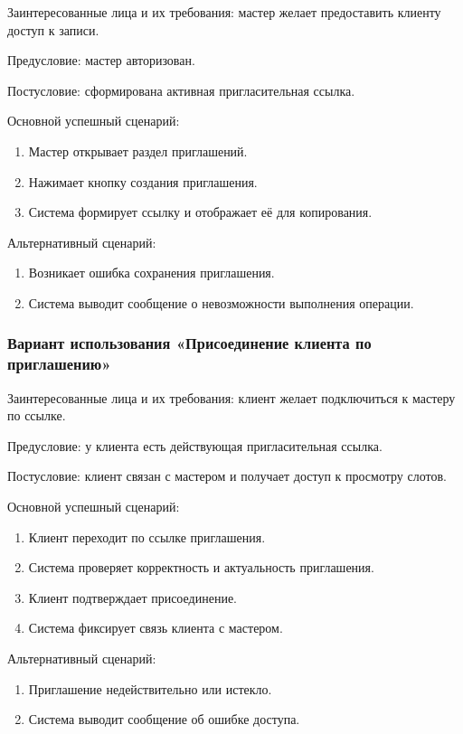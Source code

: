 Заинтересованные лица и их требования: мастер желает предоставить клиенту доступ к записи.

Предусловие: мастер авторизован.

Постусловие: сформирована активная пригласительная ссылка.

Основной успешный сценарий:
\begin{enumerate}
\item Мастер открывает раздел приглашений.
\item Нажимает кнопку создания приглашения.
\item Система формирует ссылку и отображает её для копирования.
\end{enumerate}

Альтернативный сценарий:
\begin{enumerate}
\item Возникает ошибка сохранения приглашения.
\item Система выводит сообщение о невозможности выполнения операции.
\end{enumerate}

\subsubsection{Вариант использования «Присоединение клиента по приглашению»}

Заинтересованные лица и их требования: клиент желает подключиться к мастеру по ссылке.

Предусловие: у клиента есть действующая пригласительная ссылка.

Постусловие: клиент связан с мастером и получает доступ к просмотру слотов.

Основной успешный сценарий:
\begin{enumerate}
\item Клиент переходит по ссылке приглашения.
\item Система проверяет корректность и актуальность приглашения.
\item Клиент подтверждает присоединение.
\item Система фиксирует связь клиента с мастером.
\end{enumerate}

Альтернативный сценарий:
\begin{enumerate}
\item Приглашение недействительно или истекло.
\item Система выводит сообщение об ошибке доступа.
\end{enumerate}

